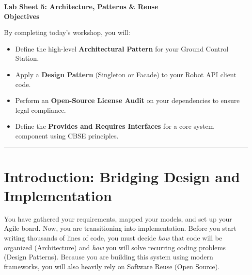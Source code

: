 \documentclass[a4paper,12pt]{article}
\begin{document}

\begin{center}
    \LARGE \textbf{Lab Sheet 5: Architecture, Patterns \& Reuse} \\
    \vspace{0.5cm}
    \large \textbf{Objectives}
\end{center}

\noindent By completing today's workshop, you will:
\begin{itemize}
    \item Define the high-level \textbf{Architectural Pattern} for your Ground Control Station.
    \item Apply a \textbf{Design Pattern} (Singleton or Facade) to your Robot API client code.
    \item Perform an \textbf{Open-Source License Audit} on your dependencies to ensure legal compliance.
    \item Define the \textbf{Provides and Requires Interfaces} for a core system component using CBSE principles.
\end{itemize}

\vspace{0.5cm}
\hrule
\vspace{0.5cm}

\section*{Introduction: Bridging Design and Implementation}
You have gathered your requirements, mapped your models, and set up your Agile board. Now, you are transitioning into implementation. Before you start writing thousands of lines of code, you must decide \textit{how} that code will be organized (Architecture) and \textit{how} you will solve recurring coding problems (Design Patterns). Because you are building this system using modern frameworks, you will also heavily rely on Software Reuse (Open Source).
\end{document}
